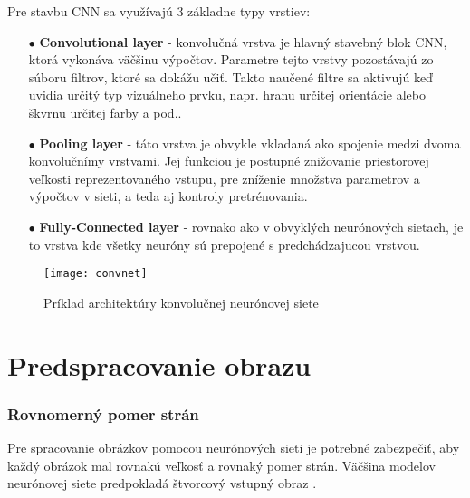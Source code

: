 Pre stavbu CNN sa využívajú 3 základne typy vrstiev:
\begin{enumerate}
    \item[$\bullet$] \textbf{Convolutional layer} - konvolučná vrstva je hlavný stavebný blok CNN, ktorá vykonáva väčšinu výpočtov.
    Parametre tejto vrstvy pozostávajú zo súboru filtrov, ktoré sa dokážu učiť.
    Takto naučené filtre sa aktivujú keď uvidia určitý typ vizuálneho prvku, napr. hranu určitej orientácie alebo škvrnu určitej farby a pod..
    \item[$\bullet$] \textbf{Pooling layer} - táto vrstva je obvykle vkladaná ako spojenie medzi dvoma konvolučnímy vrstvami.
    Jej funkciou je postupné znižovanie priestorovej veľkosti reprezentovaného vstupu, pre zníženie množstva parametrov a výpočtov v sieti, a teda aj kontroly pretrénovania.
    \item[$\bullet$] \textbf{Fully-Connected layer} - rovnako ako v obvyklých neurónových sietach, je to vrstva kde všetky neuróny sú prepojené s predchádzajucou vrstvou.
\end{enumerate}

\begin{figure}[H]
	\centering
	\texttt{[image: convnet]}
	\caption{Príklad architektúry konvolučnej neurónovej siete \cite{odkaz:CNNArchitecture}}
	\label{pic:CNNExample}
\end{figure}

\section{Predspracovanie obrazu}

\subsubsection{Rovnomerný pomer strán}
Pre spracovanie obrázkov pomocou neurónových sieti je potrebné zabezpečiť, aby každý obrázok mal rovnakú veľkosť a rovnaký pomer strán.
Väčšina modelov neurónovej siete predpokladá štvorcový vstupný obraz \cite{odkaz:NNPreprocessing}.


